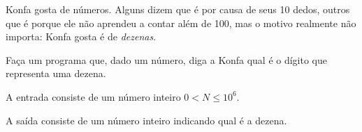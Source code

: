 
%
%

Konfa gosta de números. Alguns dizem que é por causa de seus 10 dedos, outros
que é porque ele não aprendeu a contar além de 100, mas o motivo realmente não
importa: Konfa gosta é de \emph{dezenas}.

Faça um programa que, dado um número, diga a Konfa qual é o dígito que representa
uma dezena.

\Entrada%
A entrada consiste de um número inteiro $0 < N \leq 10^6$.

\Saida%
A saída consiste de um número inteiro indicando qual é a dezena.


%
